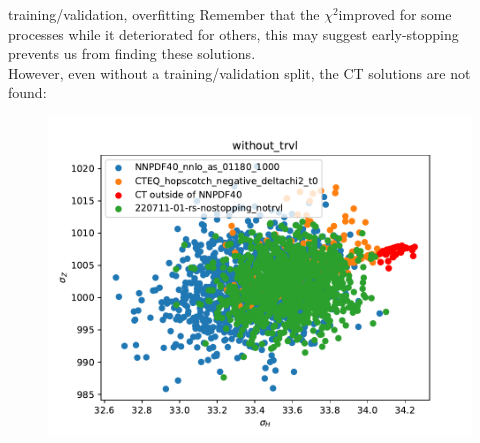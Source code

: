 \documentclass[aspectratio=169,10pt]{beamer}
\newcommand{\chitwo}{$\chi^2$}
\begin{document}
\begin{frame}[t]{training/validation, overfitting}
  Remember that the \chitwo improved for some processes while it deteriorated for others, this may suggest early-stopping prevents us from finding these solutions.\\\vspace*{.5em}
  However, even without a training/validation split, the CT solutions are not found:
  \begin{figure}
    \centering
    \includegraphics[height=.55\textheight]{without_trvl.pdf}
  \end{figure}
\end{frame}
\end{document}
